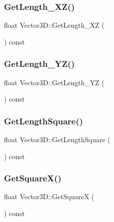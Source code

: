 \subsubsection{\texorpdfstring{Get\+Length\+\_\+\+X\+Z()}{GetLength\_XZ()}}
{\footnotesize\ttfamily float Vector3\+D\+::\+Get\+Length\+\_\+\+XZ (\begin{DoxyParamCaption}{ }\end{DoxyParamCaption}) const\hspace{0.3cm}{\ttfamily [inline]}}

\mbox{\label{class_vector3_d_a183854c5c7ea8bf32f752a02cf3fc3ce}} 
\subsubsection{\texorpdfstring{Get\+Length\+\_\+\+Y\+Z()}{GetLength\_YZ()}}
{\footnotesize\ttfamily float Vector3\+D\+::\+Get\+Length\+\_\+\+YZ (\begin{DoxyParamCaption}{ }\end{DoxyParamCaption}) const\hspace{0.3cm}{\ttfamily [inline]}}

\mbox{\label{class_vector3_d_a0d486a19d3f7515e2f147c78bb73ce07}} 
\subsubsection{\texorpdfstring{Get\+Length\+Square()}{GetLengthSquare()}}
{\footnotesize\ttfamily float Vector3\+D\+::\+Get\+Length\+Square (\begin{DoxyParamCaption}{ }\end{DoxyParamCaption}) const\hspace{0.3cm}{\ttfamily [inline]}}

\mbox{\label{class_vector3_d_a77ee5fc836fd4024bd8bdae603b1677e}} 
\subsubsection{\texorpdfstring{Get\+Square\+X()}{GetSquareX()}}
{\footnotesize\ttfamily float Vector3\+D\+::\+Get\+SquareX (\begin{DoxyParamCaption}{ }\end{DoxyParamCaption}) const\hspace{0.3cm}{\ttfamily [inline]}}

